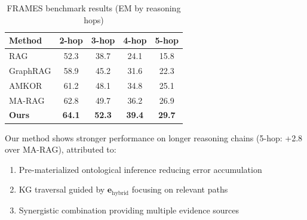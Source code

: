 \documentclass[10pt,twocolumn]{article}
\begin{document}
\begin{table}[t]
\centering
\caption{FRAMES benchmark results (EM by reasoning hops)}
\label{tab:frames}
\small
\begin{tabular}{@{}lcccc@{}}
\toprule
\textbf{Method} & \textbf{2-hop} & \textbf{3-hop} & \textbf{4-hop} & \textbf{5-hop} \\
\midrule
RAG & 52.3 & 38.7 & 24.1 & 15.8 \\
GraphRAG & 58.9 & 45.2 & 31.6 & 22.3 \\
AMKOR & 61.2 & 48.1 & 34.8 & 25.1 \\
MA-RAG & 62.8 & 49.7 & 36.2 & 26.9 \\
\midrule
\textbf{Ours} & \textbf{64.1} & \textbf{52.3} & \textbf{39.4} & \textbf{29.7} \\
\bottomrule
\end{tabular}
\end{table}

Our method shows stronger performance on longer reasoning chains (5-hop: +2.8 over MA-RAG), attributed to:
\begin{enumerate}
    \item Pre-materialized ontological inference reducing error accumulation
    \item KG traversal guided by $\mathbf{e}_{\text{hybrid}}$ focusing on relevant paths
    \item Synergistic combination providing multiple evidence sources
\end{enumerate}
\end{document}
